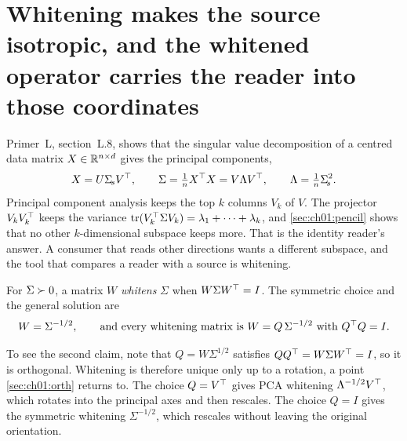 \section{Whitening makes the source isotropic, and the whitened operator carries the reader into those coordinates}\label{sec:ch01:whiten}

Primer~L, section~L.8, shows that the singular value decomposition of a
centred data matrix $X\in\mathbb{R}^{n\times d}$ gives the principal components,
\begin{equation}\label{eq:ch01:svd}
X=U\Sigma_{\!s}V^{\top},\qquad \Sigma=\tfrac1n X^{\top} X=V\Lambda V^{\top},\qquad \Lambda=\tfrac1n\Sigma_{\!s}^2 .
\end{equation}
Principal component analysis keeps the top $k$ columns $V_k$ of $V$. The
projector $V_kV_k^{\top}$ keeps the variance $\operatorname{tr}(V_k^{\top}\Sigma V_k)=\lambda_1+\dots+\lambda_k$,
and \cref{sec:ch01:pencil} shows that no other $k$-dimensional subspace keeps more.
That is the identity reader's answer. A consumer that reads other directions
wants a different subspace, and the tool that compares a reader with a source
is whitening.

\begin{definition}[Whitening]\label{def:ch01:whiten}
For $\Sigma\succ 0$, a matrix $W$ \emph{whitens} $\Sigma$ when $W\Sigma W^{\top}=I$.
The symmetric choice and the general solution are
\begin{equation}\label{eq:ch01:whiten}
W=\Sigma^{-1/2},\qquad\text{and every whitening matrix is } W=Q\,\Sigma^{-1/2}\ \text{with } Q^{\top} Q=I .
\end{equation}
\end{definition}

To see the second claim, note that $Q=W\Sigma^{1/2}$ satisfies
$QQ^{\top}=W\Sigma W^{\top}=I$, so it is orthogonal. Whitening is therefore unique only
up to a rotation, a point \cref{sec:ch01:orth} returns to. The choice
$Q=V^{\top}$ gives PCA whitening $\Lambda^{-1/2}V^{\top}$, which rotates into the
principal axes and then rescales. The choice $Q=I$ gives the symmetric whitening
$\Sigma^{-1/2}$, which rescales without leaving the original orientation.

